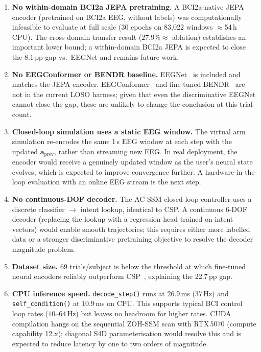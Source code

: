 \documentclass[journal]{IEEEtran}
\begin{document}
\begin{enumerate}
  \item \textbf{No within-domain BCI2a JEPA pretraining.} A BCI2a-native JEPA encoder (pretrained on BCI2a EEG, without labels) was computationally infeasible to evaluate at full scale (30 epochs on 83,022 windows $\approx$54\,h CPU). The cross-domain transfer result ($27.9\% \approx$ ablation) establishes an important lower bound; a within-domain BCI2a JEPA is expected to close the $8.1$\,pp gap vs.\ EEGNet and remains future work.
  \item \textbf{No EEGConformer or BENDR baseline.} EEGNet~\cite{lawhern2018eegnet} is included and matches the JEPA encoder. EEGConformer~\cite{song2022eegconformer} and fine-tuned BENDR~\cite{kostas2022bendr} are not in the current LOSO harness; given that even the discriminative EEGNet cannot close the gap, these are unlikely to change the conclusion at this trial count.
  \item \textbf{Closed-loop simulation uses a static EEG window.} The virtual arm simulation re-encodes the same 1\,s EEG window at each step with the updated $\mathbf{a}_\text{prev}$, rather than streaming new EEG.
    In real deployment, the encoder would receive a genuinely updated window as the user's neural state evolves, which is expected to improve convergence further.
    A hardware-in-the-loop evaluation with an online EEG stream is the next step.
  \item \textbf{No continuous-DOF decoder.} The AC-SSM closed-loop controller uses a discrete classifier $\to$ intent lookup, identical to CSP.
    A continuous 6-DOF decoder (replacing the lookup with a regression head trained on intent vectors) would enable smooth trajectories; this requires either more labelled data or a stronger discriminative pretraining objective to resolve the decoder magnitude problem.
  \item \textbf{Dataset size.} 69 trials/subject is below the threshold at which fine-tuned neural encoders reliably outperform CSP~\cite{kostas2022bendr}, explaining the 22.7\,pp gap.
  \item \textbf{CPU inference speed.} \texttt{decode\_step()} runs at $26.9$\,ms ($37$\,Hz) and \texttt{self\_condition()} at $10.9$\,ms on CPU. This supports typical BCI control loop rates ($10$--$64$\,Hz) but leaves no headroom for higher rates. CUDA compilation hangs on the sequential ZOH-SSM scan with RTX\,5070 (compute capability 12.x); diagonal S4D parameterisation would resolve this and is expected to reduce latency by one to two orders of magnitude.
\end{enumerate}
\end{document}
